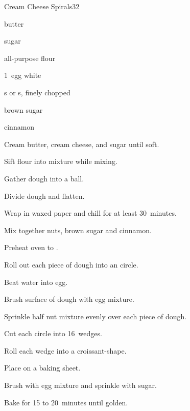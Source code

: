 \begin{recipe}{Cream Cheese Spirals}{}{32}

\begin{ingredients}
\item {} butter
\item {} 
\item \C{\quarter} sugar
\item {} all-purpose flour
\item 1~egg white
\item {} s or s, finely chopped
\item \C{\half} brown sugar
\item {} cinnamon
\end{ingredients}

\begin{directions}
\item Cream butter, cream cheese, and sugar until soft.
\item Sift flour into mixture while mixing.
\item Gather dough into a ball.
\item Divide dough and flatten.
\item Wrap in waxed paper and chill for at least 30~minutes.
\item Mix together nuts, brown sugar and cinnamon.
\item Preheat oven to .
\item Roll out each piece of dough into an  circle.
\item Beat  water into egg.
\item Brush surface of dough with egg mixture.
\item Sprinkle half nut mixture evenly over each piece of dough.
\item Cut each circle into 16~wedges.
\item Roll each wedge into a croissant-shape.
\item Place on a baking sheet.
\item Brush with egg mixture and sprinkle with sugar.
\item Bake for 15 to 20~minutes until golden.
\end{directions}

\end{recipe}
